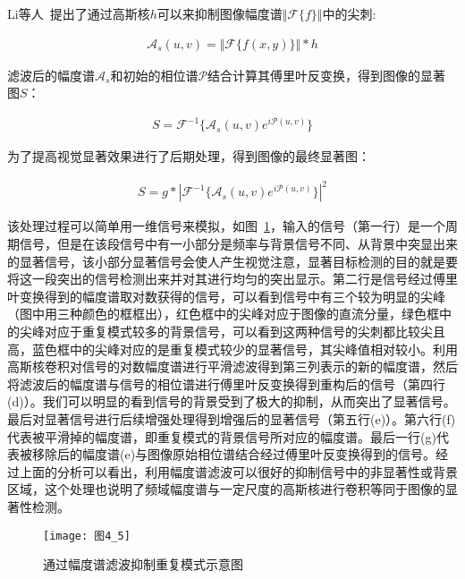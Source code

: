 Li等人~\cite{LiJianTPAMI2013Scale}提出了通过高斯核$h$可以来抑制图像幅度谱$\Vert \mathcal{F}\{f\}\Vert$中的尖刺:
\begin{linenomath}
\begin{align}
\mathcal{A}_{s}(u,v)=\Vert \mathcal{F}\{f(x,y)\}\Vert\ast h
\label{式4_2}
\end{align}
\end{linenomath}
滤波后的幅度谱$\mathcal{A}_{s}$和初始的相位谱$\mathcal{P}$结合计算其傅里叶反变换，得到图像的显著图$S$：
\begin{linenomath}
\begin{align}
S=\mathcal{F}^{-1}\{\mathcal{A}_{s}(u,v)e^{i\mathcal{P}(u,v)}\}
\label{式4_3}
\end{align}
\end{linenomath}
为了提高视觉显著效果进行了后期处理，得到图像的最终显著图：
\begin{linenomath}
\begin{align}
S=g*|\mathcal{F}^{-1}\{\mathcal{A}_{s}(u,v)e^{i\mathcal{P}(u,v)}\}|^{2}
\label{式4_4}
\end{align}
\end{linenomath}
该处理过程可以简单用一维信号来模拟，如图~\ref{图4_5}，输入的信号（第一行）是一个周期信号，但是在该段信号中有一小部分是频率与背景信号不同、从背景中突显出来的显著信号，该小部分显著信号会使人产生视觉注意，显著目标检测的目的就是要将这一段突出的信号检测出来并对其进行均匀的突出显示。第二行是信号经过傅里叶变换得到的幅度谱取对数获得的信号，可以看到信号中有三个较为明显的尖峰（图中用三种颜色的框框出），红色框中的尖峰对应于图像的直流分量，绿色框中的尖峰对应于重复模式较多的背景信号，可以看到这两种信号的尖刺都比较尖且高，蓝色框中的尖峰对应的是重复模式较少的显著信号，其尖峰值相对较小。利用高斯核卷积对信号的对数幅度谱进行平滑滤波得到第三列表示的新的幅度谱，然后将滤波后的幅度谱与信号的相位谱进行傅里叶反变换得到重构后的信号（第四行(d)）。我们可以明显的看到信号的背景受到了极大的抑制，从而突出了显著信号。最后对显著信号进行后续增强处理得到增强后的显著信号（第五行(e)）。第六行(f)代表被平滑掉的幅度谱，即重复模式的背景信号所对应的幅度谱。最后一行(g)代表被移除后的幅度谱(e)与图像原始相位谱结合经过傅里叶反变换得到的信号。经过上面的分析可以看出，利用幅度谱滤波可以很好的抑制信号中的非显著性或背景区域，这个处理也说明了频域幅度谱与一定尺度的高斯核进行卷积等同于图像的显著性检测。
\begin{figure}[h]
  \centering
  \texttt{[image: 图4\_5]}
  \caption{通过幅度谱滤波抑制重复模式示意图}   
  \label{图4_5} 
\end{figure}

